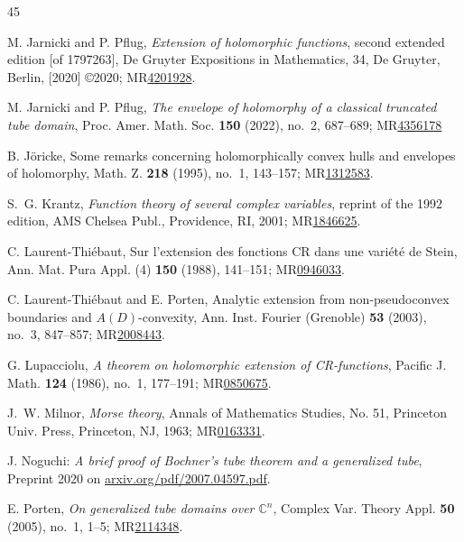 \documentclass[12pt,reqno, a4paper]{amsart}
\theoremstyle{definition}
\theoremstyle{definition}
\numberwithin{equation}{section}
\def\C{\mathbb{C}}                              %
\begin{document}
\begin{thebibliography}{45}
		
	
 M. Jarnicki and P. Pflug, {\it Extension of holomorphic functions}, second extended edition [of 1797263], De Gruyter Expositions in Mathematics, 34, De Gruyter, Berlin, [2020] \copyright 2020; MR\href{https://mathscinet.ams.org/mathscinet/article?mr=4201928}{4201928}.
	
 M. Jarnicki and P. Pflug, \textit{The envelope of holomorphy of a classical truncated tube domain}, Proc. Amer. Math. Soc. {\bf 150} (2022), no.~2, 687--689; MR\href{https://mathscinet.ams.org/mathscinet/article?mr=4356178}{4356178}
	
 B. J\"oricke, Some remarks concerning holomorphically convex hulls and envelopes of holomorphy, Math. Z. {\bf 218} (1995), no.~1, 143--157; MR\href{https://mathscinet.ams.org/mathscinet/article?mr=1312583}{1312583}.


 S.~G. Krantz, {\it Function theory of several complex variables}, reprint of the 1992 edition, 
AMS Chelsea Publ., Providence, RI, 2001; MR\href{https://mathscinet.ams.org/mathscinet/article?mr=1846625}{1846625}.


 C. Laurent-Thi\'ebaut, Sur l'extension des fonctions CR dans une vari\'et\'e{} de Stein, Ann. Mat. Pura Appl. (4) {\bf 150} (1988), 141--151; MR\href{https://mathscinet.ams.org/mathscinet/article?mr=946033}{0946033}.

 C. Laurent-Thi\'ebaut and E. Porten, Analytic extension from non-pseudoconvex boundaries and $A(D)$-convexity, Ann. Inst. Fourier (Grenoble) {\bf 53} (2003), no.~3, 847--857; MR\href{https://mathscinet.ams.org/mathscinet/article?mr=2008443}{2008443}.

 G. Lupacciolu, \textit{A theorem on holomorphic extension of CR-functions}, Pacific J. Math. {\bf 124} (1986), no.~1, 177--191; MR\href{https://mathscinet.ams.org/mathscinet/article?mr=850675}{0850675}.


 J.~W. Milnor, {\it Morse theory}, Annals of Mathematics Studies, No. 51, Princeton Univ. Press, Princeton, NJ, 1963; MR\href{https://mathscinet.ams.org/mathscinet/article?mr=163331}{0163331}.
	
	J. Noguchi: \textit{A brief proof of Bochner's tube theorem and a generalized tube}, Preprint 2020
on \href{https://arxiv.org/abs/2007.04597}{arxiv.org/pdf/2007.04597.pdf}.


 E. Porten, \textit{On generalized tube domains over $\C^n$}, Complex Var. Theory Appl. {\bf 50} (2005), no.~1, 1--5; MR\href{https://mathscinet.ams.org/mathscinet/article?mr=2114348}{2114348}.



\end{thebibliography}
\end{document}
